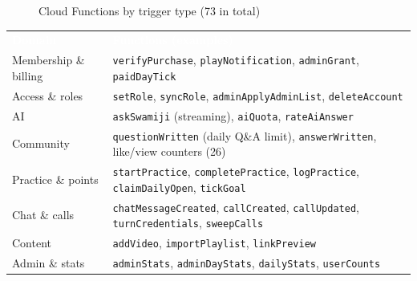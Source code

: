 \documentclass[11pt,a4paper,oneside]{report}
\newcommand{\thead}[1]{\textcolor{white}{\bfseries #1}}
\newcommand{\headrow}{\rowcolor{ojDeep}}
\begin{document}
\begin{figure}[H]
\centering
{}
\caption{Cloud Functions by trigger type (73 in total)}
\label{fig:fncount}
\end{figure}

\begin{tabularx}{\textwidth}{@{}p{3.3cm}L@{}}
\headrow \thead{Domain} & \thead{Functions (examples)} \\
Membership \& billing & \texttt{verifyPurchase}, \texttt{playNotification}, \texttt{adminGrant}, \texttt{paidDayTick} \\
Access \& roles & \texttt{setRole}, \texttt{syncRole}, \texttt{adminApplyAdminList}, \texttt{deleteAccount} \\
AI & \texttt{askSwamiji} (streaming), \texttt{aiQuota}, \texttt{rateAiAnswer} \\
Community & \texttt{questionWritten} (daily Q\&A limit), \texttt{answerWritten}, like/view counters (26) \\
Practice \& points & \texttt{startPractice}, \texttt{completePractice}, \texttt{logPractice}, \texttt{claimDailyOpen}, \texttt{tickGoal} \\
Chat \& calls & \texttt{chatMessageCreated}, \texttt{callCreated}, \texttt{callUpdated}, \texttt{turnCredentials}, \texttt{sweepCalls} \\
Content & \texttt{addVideo}, \texttt{importPlaylist}, \texttt{linkPreview} \\
Admin \& stats & \texttt{adminStats}, \texttt{adminDayStats}, \texttt{dailyStats}, \texttt{userCounts} \\
\bottomrule
\end{tabularx}
\end{document}
